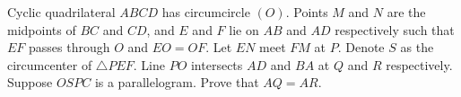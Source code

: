 Cyclic quadrilateral $ABCD$ has circumcircle $(O)$. Points $M$ and $N$ are the midpoints of $BC$ and $CD$, and  $E$ and $F$ lie on $AB$ and $AD$ respectively such that $EF$ passes through $O$ and $EO=OF$.  Let $EN$ meet $FM$ at $P$. Denote $S$ as the circumcenter of $\triangle PEF$. Line $PO$ intersects $AD$ and $BA$ at $Q$ and $R$ respectively. Suppose $OSPC$ is a parallelogram.  Prove that $AQ=AR$.